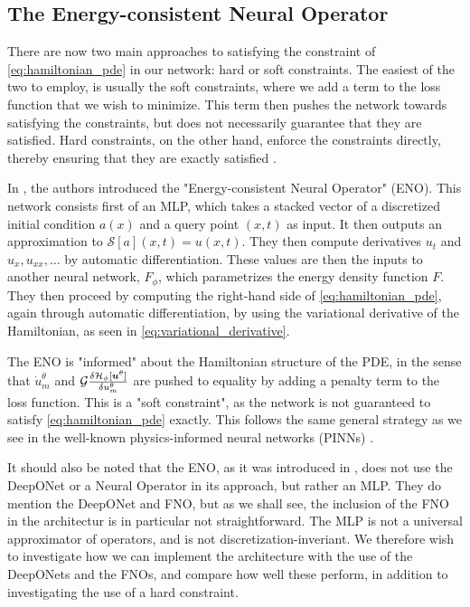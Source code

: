 \subsection{The Energy-consistent Neural Operator}

There are now two main approaches to satisfying the constraint of \cref{eq:hamiltonian_pde} in our network: hard or soft constraints.
The easiest of the two to employ, is usually the soft constraints, where we add a term to the loss function that we wish to minimize.
This term then pushes the network towards satisfying the constraints, but does not necessarily guarantee that they are satisfied.
Hard constraints, on the other hand, enforce the constraints directly, thereby ensuring that they are exactly satisfied .

In , the authors introduced the "Energy-consistent Neural Operator" (ENO).
This network consists first of an MLP, which takes a stacked vector of a discretized initial condition \(a(x)\) and a query point \((x,t)\) as input. It then outputs an approximation to \(\mathcal{S}[a](x,t)=u(x,t)\).
They then compute derivatives \(u_t\) and \(u_x, u_{xx}, \ldots\) by automatic differentiation. These values are then the inputs to another neural network, \(F_\phi\), which parametrizes the energy density function \(F\).
They then proceed by computing the right-hand side of \cref{eq:hamiltonian_pde}, again through automatic differentiation, by using the variational derivative of the Hamiltonian, as seen in \cref{eq:variational_derivative}. 

The ENO is "informed" about the Hamiltonian structure of the PDE, in the sense that \(\dot{u}_m^\theta\) and \(\mathcal{G} \frac{\delta \mathcal{H}_\phi[\bm{u}^\theta]}{\delta u_m^\theta}\) are 
pushed to equality by adding a penalty term to the loss function. This is a "soft constraint", as the network is not 
guaranteed to satisfy \cref{eq:hamiltonian_pde} exactly.
This follows the same general strategy as we see in the well-known physics-informed neural networks (PINNs) .

It should also be noted that the ENO, as it was introduced in \cite{tanakaNeuralOperatorsMeet2024}, does not use the DeepONet or a Neural Operator in its approach, but rather an MLP.
They do mention the DeepONet and FNO, but as we shall see, the inclusion of the FNO in the architectur is in particular not straightforward.
The MLP is not a universal approximator of operators, and is not discretization-inveriant.
We therefore wish to investigate how we can implement the architecture with the use of the DeepONets and the FNOs, and compare how well these perform, in addition to investigating the use of a hard constraint.

